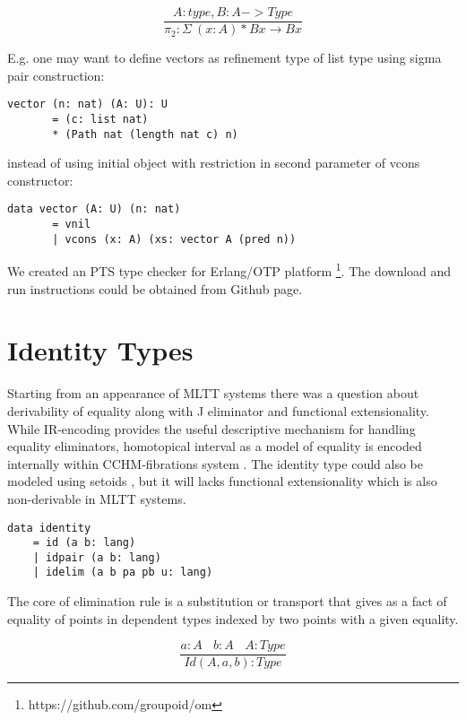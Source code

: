 \documentclass{article}
\begin{document}
\begin{equation}
\tag{$\pi_1$-elimination}
\dfrac
{A: type, B: A -> Type}
{\pi_2 : \Sigma\ (x:A) * B x \rightarrow B x}
\end{equation}

\newpage
E.g. one may want to define vectors as refinement type of list type using sigma pair construction:

\begin{lstlisting}[mathescape=true]
    vector (n: nat) (A: U): U
       = (c: list nat)
       * (Path nat (length nat c) n)
\end{lstlisting}

instead of using initial object with restriction in second parameter of vcons constructor:

\begin{lstlisting}[mathescape=true]
    data vector (A: U) (n: nat)
       = vnil
       | vcons (x: A) (xs: vector A (pred n))
\end{lstlisting}

We created an PTS type checker for Erlang/OTP platform \footnote{https://github.com/groupoid/om}.
The download and run instructions could be obtained from Github page.


\section{Identity Types}

Starting from an appearance of MLTT systems there was a question about derivability of equality
along with J eliminator and functional extensionality. While IR-encoding \cite{Dagand13} provides
the useful descriptive mechanism for handling equality eliminators, homotopical interval
as a model of equality is encoded internally within CCHM-fibrations system \cite{Orton17}. The
identity type could also be modeled using setoids \cite{Bishop67}, but it will lacks functional
extensionality which is also non-derivable in MLTT systems.

\begin{lstlisting}[mathescape=true]
data identity
    = id (a b: lang)
    | idpair (a b: lang)
    | idelim (a b pa pb u: lang)
\end{lstlisting}

The core of elimination rule is a substitution or transport that gives as
a fact of equality of points in dependent types indexed by two points with a given equality.

\begin{equation}
\tag{$Id$-formation}
\dfrac
  {a:A\ \ \ \ b:A\ \ \ \ A:Type}
  {Id(A,a,b) : Type}
\end{equation}
\end{document}
